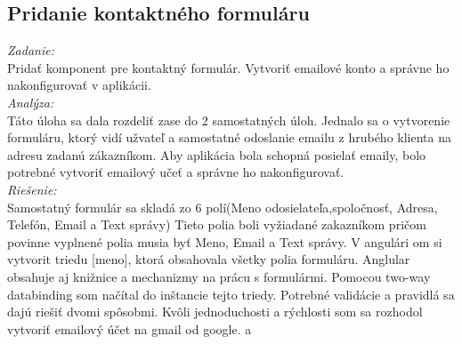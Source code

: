 \documentclass[11pt, oneside]{report}
\begin{document}
\subsection*{Pridanie kontaktného formuláru }
\textit{Zadanie:}\\
Pridať komponent pre kontaktný formulár. Vytvoriť emailové konto a správne ho nakonfigurovať v aplikácii.
\\\textit{Analýza:}\\
Táto úloha sa dala rozdeliť zase do 2 samostatných úloh. Jednalo sa o vytvorenie formuláru, ktorý vidí užvateľ a  samostatné odoslanie emailu z hrubého klienta na adresu zadanú zákazníkom. Aby aplikácia bola schopná posielať emaily, bolo potrebné vytvoriť emailový učeť a správne ho nakonfigurovať.
\\\textit{Riešenie:}\\
Samostatný formulár sa skladá zo 6 polí(Meno odosielateľa,spoločnosť, Adresa, Telefón, Email a Text správy) Tieto polia boli vyžiadané zakazníkom  pričom povinne vyplnené polia musia byť Meno, Email a Text správy. V angulári om si vytvorit triedu [meno], ktorá obsahovala všetky polia formuláru. Anglular obsahuje aj knižnice a mechanizmy na prácu s formulármi. Pomocou two-way databinding som načítal do inštancie tejto triedy. Potrebné validácie a pravidlá sa dajú riešiť dvomi spôsobmi.  Kvôli jednoduchosti a rýchlosti som sa rozhodol vytvoriť emailový účet na gmail od google.
a
\end{document}
